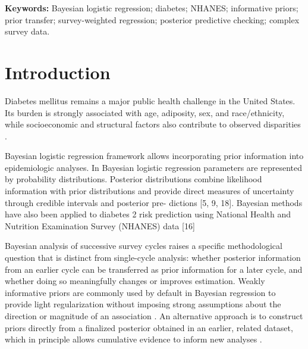 \documentclass[11pt]{article}
\begin{document}
\begin{abstract}
\textbf{Conclusions:} Cycle-1-informed priors produced posterior estimates
nearly identical to weakly informative priors and did not improve predictive
performance in NHANES Cycle 2, indicating that the large Cycle 2 sample
dominated the likelihood and that no material prior-data conflict was
present for the harmonized predictors (age, BMI, sex). Age and BMI remained
the strongest and most consistent predictors of diabetes across both NHANES
cycles and both frequentist and Bayesian frameworks. As in Cycle 1, Bayesian
model-based prevalence exceeded the design-based survey-weighted estimate,
reinforcing that normalized examination weights alone do not reproduce
design-based population inference.

\end{abstract}

\noindent\textbf{Keywords:} Bayesian logistic regression; diabetes;
NHANES; informative priors; prior transfer; survey-weighted regression;
posterior predictive checking; complex survey data.

\section{Introduction}


Diabetes mellitus remains a major public health challenge in the
United States. Its burden is strongly associated with age, adiposity,
sex, and race/ethnicity, while socioeconomic and structural factors
also contribute to observed disparities \citep{Gwira2024}.

Bayesian logistic regression framework allows incorporating prior information into epidemiologic analyses. In Bayesian logistic regression
parameters are represented by probability distributions. Posterior distributions combine likelihood information with prior distributions and provide
direct measures of uncertainty through credible intervals and posterior pre-
dictions [5, 9, 18]. 
Bayesian methods have also been applied to diabetes
2
risk prediction using National Health and Nutrition Examination Survey
(NHANES) data [16]


Bayesian analysis of successive survey cycles raises a specific
methodological question that is distinct from single-cycle analysis: whether
posterior information from an earlier cycle can be transferred as prior
information for a later cycle, and whether doing so meaningfully changes or
improves estimation. Weakly informative priors are commonly used by default
in Bayesian regression to provide light regularization without imposing
strong assumptions about the direction or magnitude of an association
\citep{Gelman2008}. An alternative approach is to construct priors directly
from a finalized posterior obtained in an earlier, related dataset, which in
principle allows cumulative evidence to inform new analyses
\citep{Kruschke2017,VandeSchoot2021}.
\end{document}
